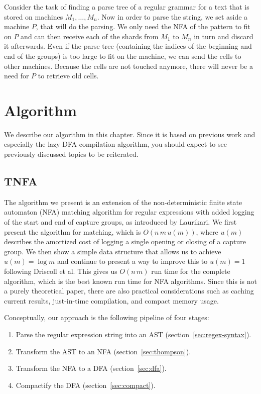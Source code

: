 \documentclass[11pt,a4paper,twoside,openright]{Thesis}
\theoremstyle{definition}
\newcommand{\Secref}[1]{section~\ref{sec:#1}}
\newcommand{\seclabel}[1]{\label{sec:#1}}
\begin{document}
Consider the task of finding a parse tree of a regular grammar for a text
that is stored on machines $M_1, \dots, M_n$. Now in order to parse the
string, we set aside a machine $P$, that will do the parsing. We only need the NFA of the
pattern to fit on $P$ and can then receive each of the shards
from $M_1$ to $M_n$ in turn and discard it afterwards. Even if the parse tree
(containing the indices of the beginning and end of the groups) is too large
to fit on the machine, we can send the cells to other machines. Because the
cells are not touched anymore, there will never be a need for $P$ to retrieve
old cells.

\chapter{Algorithm} \seclabel{algo}
We describe our algorithm in this chapter. Since it is based on previous
work and especially the lazy DFA compilation algorithm, you should expect to
see previously discussed topics to be reiterated.

\section{TNFA}\label{sec:tnfa}

The algorithm we present is an extension of the non-deterministic finite state
automaton (NFA) matching algorithm for regular expressions with added logging
of the start and end of capture groups, as introduced by
Laurikari\cite{Laur00a}. We first present the algorithm for matching,
which is $O(n\, m\, u(m))$, where $u(m)$ describes the amortized cost of
logging a single opening or closing of a capture group. We then show a
simple data structure that allows us to achieve $u(m) = \log m$ and
continue to present a way to improve this to $u(m) = 1$ following Driscoll et
al\cite{Dris89a}. This gives us $O(n\, m)$ run time for the
complete algorithm, which is the best known run time for NFA algorithms. Since
this is not a purely theoretical paper, there are also practical considerations
such as caching current results, just-in-time compilation, and compact memory
usage.

Conceptually, our approach is the following pipeline of four stages:
\begin{enumerate}
  \item Parse the regular expression string into an AST (\Secref{regex-syntax}).
  \item Transform the AST to an NFA (\Secref{thompson}).
  \item Transform the NFA to a DFA (\Secref{dfa}).
  \item Compactify the DFA (\Secref{compact}).
\end{enumerate}
\end{document}
